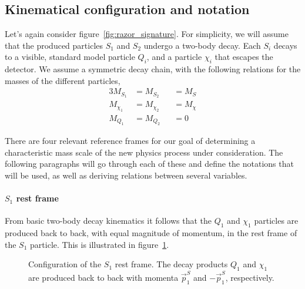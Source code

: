 
\subsection{Kinematical configuration and notation \label{sec:razor_notation}}

Let's again consider figure~\ref{fig:razor_signature}. For simplicity, we will assume that the
produced particles $S_1$ and $S_2$ undergo a two-body decay. Each $S_i$ decays to a visible,
standard model particle $Q_i$, and a particle $\chi_i$ that escapes the detector. 
We assume a symmetric decay chain, with the following relations for the masses of the different
particles,
\begin{alignat}{3}
  M_{S_1} &= M_{S_2} &&= M_S \label{eq:equal_S_masses}\\
  M_{\chi_1} &= M_{\chi_2} &&= M_{\chi} \label{eq:equal_chi_masses}\\
  M_{Q_1} &= M_{Q_2} &&= 0 \label{eq:no_Q_masses}
\end{alignat}

There are four relevant reference frames for our goal of determining a characteristic mass scale
of the new physics process under consideration. The following paragraphs will go through each of
these and define the notations that will be used, as well as deriving relations between several
variables. 

\paragraph{$S_1$ rest frame} 
From basic two-body decay kinematics it follows that the $Q_1$ and $\chi_1$ particles are produced
back to back, with equal magnitude of momentum, in the rest frame of the $S_1$ particle. This is
illustrated in figure~\ref{fig:razor_S1_rest_frame}. 

\begin{figure}[htpb]
  \centering
  \caption{Configuration of the $S_1$ rest frame. The decay products $Q_1$ and $\chi_1$ are
produced back to back with momenta $\vec{p}^S_1$ and $-\vec{p}^S_1$, respectively. 
\label{fig:razor_S1_rest_frame}}
\end{figure}

